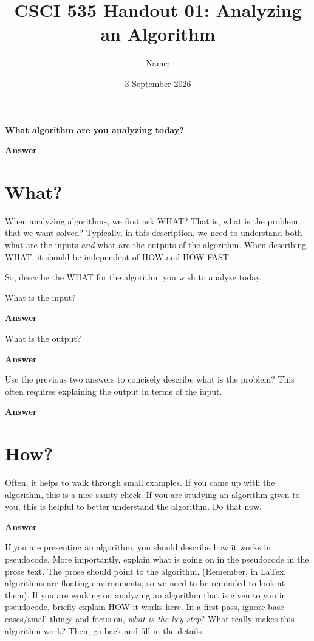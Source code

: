 \documentclass{article}
\title{CSCI 535 Handout 01: Analyzing an Algorithm}
\author{Name: \rule{3in}{0.15mm}}
\date{3 September 2026}
\begin{document}
\maketitle

\noindent
{\bf What algorithm are you analyzing today?}

\textbf{Answer}
\vspace{1in}

\section{What?}

When analyzing algorithms, we first ask WHAT?  That is, what is the problem that
we want solved?  Typically, in this description, we need to understand both what
are the inputs \emph{and} what are the outputs of the algorithm.  When
describing WHAT, it should be independent of HOW and HOW FAST.

So, describe the WHAT for the algorithm you wish to analyze today.

What is the input?

\textbf{Answer}
\vspace{0.75in}

What is the output?

\textbf{Answer}
\vspace{0.75in}

Use the previous two answers to concisely describe what is the problem?  This
often requires explaining the output in terms of the input.

\textbf{Answer}
\vspace{1in}

\section{How?}

Often, it helps to walk through small examples.  If you came up with the
algorithm, this is a nice sanity check.  If you are studying an algorithm given
to you, this is helpful to better understand the algorithm.  Do that now.

\textbf{Answer}
\vspace{3in}

If you are presenting an algorithm, you should describe how it works in
pseudocode.  More importantly, explain what is going on in the pseudocode in the
prose text.  The prose should point to the algorithm.  (Remember, in LaTex,
algorithms are floating environments, so we need to be reminded to look at
them). If you are working on analyzing an algorithm that is given to you in
pseudocode, briefly explain HOW it works here.  In a first pass, ignore base cases/small
things and
focus on, \emph{what is the key step}? What really makes this algorithm work?
Then, go back and fill in the details.
\end{document}
